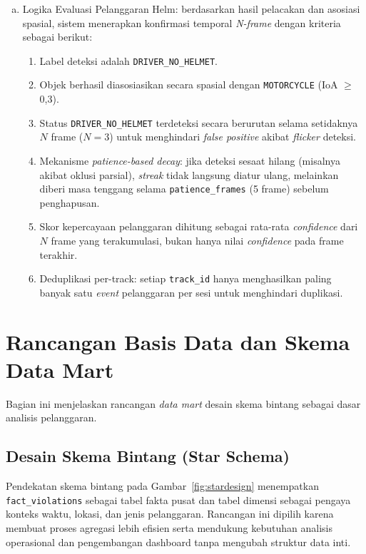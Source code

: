 \begin{enumerate}[a.]
  \item {Logika Evaluasi Pelanggaran Helm}: berdasarkan hasil pelacakan dan asosiasi spasial, sistem menerapkan konfirmasi temporal \textit{N-frame} dengan kriteria sebagai berikut:
  \begin{enumerate}[1).]
    \item Label deteksi adalah \texttt{DRIVER\_NO\_HELMET}.
    \item Objek berhasil diasosiasikan secara spasial dengan \texttt{MOTORCYCLE} (IoA $\geq$ 0{,}3).
    \item Status \texttt{DRIVER\_NO\_HELMET} terdeteksi secara berurutan selama setidaknya $N$ frame ($N=3$) untuk menghindari \textit{false positive} akibat \textit{flicker} deteksi.
    \item Mekanisme \textit{patience-based decay}: jika deteksi sesaat hilang (misalnya akibat oklusi parsial), \textit{streak} tidak langsung diatur ulang, melainkan diberi masa tenggang selama \texttt{patience\_frames} (5 frame) sebelum penghapusan.
    \item Skor kepercayaan pelanggaran dihitung sebagai rata-rata \textit{confidence} dari $N$ frame yang terakumulasi, bukan hanya nilai \textit{confidence} pada frame terakhir.
    \item Deduplikasi per-track: setiap \texttt{track\_id} hanya menghasilkan paling banyak satu \textit{event} pelanggaran per sesi untuk menghindari duplikasi.
  \end{enumerate}
\end{enumerate}

\section{Rancangan Basis Data dan Skema Data Mart}
Bagian ini menjelaskan rancangan \textit{data mart} desain skema bintang sebagai dasar analisis pelanggaran.


\subsection{Desain Skema Bintang (Star Schema)}
Pendekatan skema bintang pada Gambar~\ref{fig:stardesign} menempatkan \texttt{fact\_violations} sebagai tabel fakta pusat dan tabel dimensi sebagai pengaya konteks waktu, lokasi, dan jenis pelanggaran. Rancangan ini dipilih karena membuat proses agregasi lebih efisien serta mendukung kebutuhan analisis operasional dan pengembangan dashboard tanpa mengubah struktur data inti.

